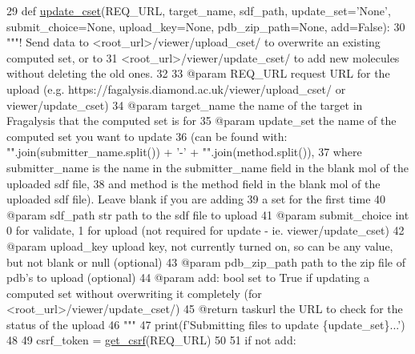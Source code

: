 \begin{DoxyCode}
29 \textcolor{keyword}{def }\hyperlink{namespacefragalysis__api_1_1xcextracter_1_1computed__set__update_a3fd757f4575c325be0c0288fa1f0738d}{update\_cset}(REQ\_URL, target\_name, sdf\_path, update\_set='None', submit\_choice=None, 
      upload\_key=None, pdb\_zip\_path=None, add=False):
30     \textcolor{stringliteral}{"""! Send data to <root\_url>/viewer/upload\_cset/ to overwrite an existing computed set, or to }
31 \textcolor{stringliteral}{    <root\_url>/viewer/update\_cset/ to add new molecules without deleting the old ones.}
32 \textcolor{stringliteral}{}
33 \textcolor{stringliteral}{    @param REQ\_URL request URL for the upload (e.g. https://fagalysis.diamond.ac.uk/viewer/upload\_cset/ or
       viewer/update\_cset)}
34 \textcolor{stringliteral}{    @param target\_name the name of the target in Fragalysis that the computed set is for}
35 \textcolor{stringliteral}{    @param update\_set the name of the computed set you want to update }
36 \textcolor{stringliteral}{        (can be found with: "".join(submitter\_name.split()) + '-' + "".join(method.split()),}
37 \textcolor{stringliteral}{        where submitter\_name is the name in the submitter\_name field in the blank mol of the uploaded sdf
       file,}
38 \textcolor{stringliteral}{        and method is the method field in the blank mol of the uploaded sdf file). Leave blank if you are
       adding}
39 \textcolor{stringliteral}{        a set for the first time}
40 \textcolor{stringliteral}{    @param sdf\_path str path to the sdf file to upload}
41 \textcolor{stringliteral}{    @param submit\_choice int 0 for validate, 1 for upload (not required for update - ie.
       viewer/update\_cset)}
42 \textcolor{stringliteral}{    @param upload\_key upload key, not currently turned on, so can be any value, but not blank or null
       (optional)}
43 \textcolor{stringliteral}{    @param pdb\_zip\_path path to the zip file of pdb's to upload (optional)}
44 \textcolor{stringliteral}{    @param add: bool set to True if updating a computed set without overwriting it completely (for
       <root\_url>/viewer/update\_cset/)}
45 \textcolor{stringliteral}{    @return taskurl the URL to check for the status of the upload}
46 \textcolor{stringliteral}{    """}
47     print(f\textcolor{stringliteral}{'Submitting files to update \{update\_set\}...'})
48     
49     csrf\_token = \hyperlink{namespacefragalysis__api_1_1xcextracter_1_1computed__set__update_a5737d189121121fcfc89d399bf38e877}{get\_csrf}(REQ\_URL)
50     
51     \textcolor{keywordflow}{if} \textcolor{keywordflow}{not} add:

\end{DoxyCode}
